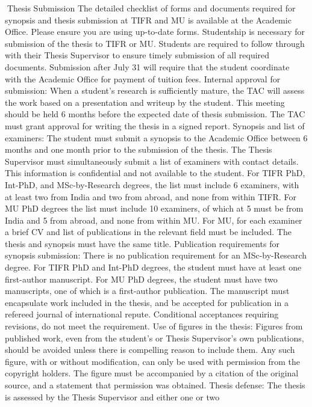 \documentclass[a4paper,10pt]{article}
\begin{document}
Thesis Submission
The detailed checklist of forms and documents required for synopsis and thesis submission
at TIFR and MU is available at the Academic Office. Please ensure you are using up-to-date
forms. Studentship is necessary for submission of the thesis to TIFR or MU. Students are
required to follow through with their Thesis Supervisor to ensure timely submission of all
required documents. Submission after July 31 will require that the student coordinate with
the Academic Office for payment of tuition fees.
Internal approval for submission: When a student’s research is sufficiently mature, the
TAC will assess the work based on a presentation and writeup by the student. This meeting
should be held 6 months before the expected date of thesis submission. The TAC must grant
approval for writing the thesis in a signed report.
Synopsis and list of examiners: The student must submit a synopsis to the Academic
Office between 6 months and one month prior to the submission of the thesis. The Thesis
Supervisor must simultaneously submit a list of examiners with contact details. This
information is confidential and not available to the student. For TIFR PhD, Int-PhD, and
MSc-by-Research degrees, the list must include 6 examiners, with at least two from India
and two from abroad, and none from within TIFR. For MU PhD degrees the list must
include 10 examiners, of which at 5 must be from India and 5 from abroad, and none from
within MU. For MU, for each examiner a brief CV and list of publications in the relevant
field must be included. The thesis and synopsis must have the same title.
Publication requirements for synopsis submission: There is no publication requirement
for an MSc-by-Research degree. For TIFR PhD and Int-PhD degrees, the student must have
at least one first-author manuscript. For MU PhD degrees, the student must have two
manuscripts, one of which is a first-author publication. The manuscript must encapsulate
work included in the thesis, and be accepted for publication in a refereed journal of
international repute. Conditional acceptances requiring revisions, do not meet the
requirement.
Use of figures in the thesis: Figures from published work, even from the student’s or
Thesis Supervisor’s own publications, should be avoided unless there is compelling reason
to include them. Any such figure, with or without modification, can only be used with
permission from the copyright holders. The figure must be accompanied by a citation of the
original source, and a statement that permission was obtained.
Thesis defense: The thesis is assessed by the Thesis Supervisor and either one or two
\end{document}
